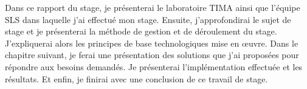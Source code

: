 Dans ce rapport du stage, je présenterai le laboratoire TIMA ainsi que l'équipe SLS dans laquelle j'ai effectué mon stage. Ensuite, j'approfondirai le sujet de stage et je
présenterai la méthode de gestion et de déroulement du stage. J'expliquerai alors les principes de base technologiques mise en œuvre. Dans le chapitre suivant, je ferai une présentation des solutions
que j'ai proposées pour répondre aux besoins demandés. Je présenterai l'implémentation effectuée et les résultats.
Et enfin, je finirai avec une conclusion de ce travail de stage.